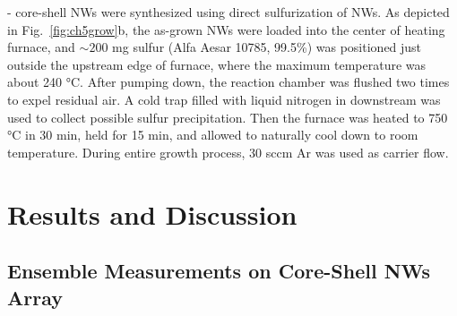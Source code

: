 - core-shell NWs were synthesized using direct sulfurization of  NWs. As depicted in Fig.~\ref{fig:ch5grow}b, the as-grown  NWs were loaded into the center of heating furnace, and $\sim200$ mg sulfur (Alfa Aesar 10785, 99.5\%) was positioned just outside the upstream edge of furnace, where the maximum temperature was about 240 \si{\degreeCelsius}. After pumping down, the reaction chamber was flushed two times to expel residual air. A cold trap filled with liquid nitrogen in downstream was used to collect possible sulfur precipitation. Then the furnace was heated to 750 \si{\degreeCelsius} in 30 min, held for 15 min, and allowed to naturally cool down to room temperature. During entire growth process, 30 sccm Ar was used as carrier flow.

\section{Results and Discussion}
\subsection{Ensemble Measurements on Core-Shell NWs Array}

